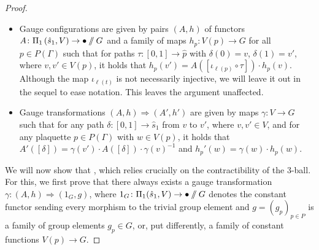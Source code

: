 \documentclass[10pt,a4paper]{amsart}
\newcommand{\sslash}{\mathbin{/\mkern-6mu/}}
\numberwithin{equation}{section}
\theoremstyle{definition}
\begin{document}
\begin{proof}
\begin{itemize}\itemsep=0pt
 \item Gauge configurations are given by pairs $(A, h)$ of functors $A\colon \Pi_1\left(\hat{s}_1, V\right) \rightarrow \bullet \sslash G$ and a family of maps $h_p\colon V(p) \rightarrow G$ for all $p \in P(\Gamma)$ such that for paths $\tau\colon [0,1] \rightarrow \hat{p}$ with $\delta(0) = v$, $\delta(1) = v'$, where $v, v' \in V(p)$, it holds that $h_p(v')= A([\iota_{\ell(p)} \circ \tau]) \cdot h_p(v)$. Although the map $\iota_{\ell(t)}$ is not necessarily injective, we will leave it out in the sequel to ease notation. This leaves the argument unaffected.
 \item Gauge transformations $(A, h) \Rightarrow (A', h')$ are given by maps $\gamma\colon V \rightarrow G$ such that for any path $\delta\colon [0,1] \rightarrow \hat{s}_1$ from $v$ to $v'$, where $v, v' \in V$, and for any plaquette $p \in P(\Gamma)$ with $w \in V(p)$, it holds that $A'([\delta]) = \gamma(v') \cdot A([\delta]) \cdot \gamma(v)^{-1}$ and $h_p'(w) = \gamma(w) \cdot h_p(w)$.
\end{itemize}
We will now show that \smash{$\mathcal{A}^{\mathbb{S}_{\Gamma} \bullet} \sslash \mathcal{G}^{\mathbb{S}_{\Gamma \bullet}} \simeq \bigl(\prod_{p \in P(\Gamma)}G\bigr) \sslash G =: G^P \sslash G$}, which relies crucially on the contractibility of the 3-ball. For this, we first prove that there always exists a gauge transformation $\gamma\colon (A,h) \Rightarrow (1_G, g)$, where $1_G\colon \Pi_1 (\hat{s}_1, V ) \rightarrow \bullet \sslash G$ denotes the constant functor sending every morphism to the trivial group element and $g = (g_p)_{p \in P}$ is a family of group elements $g_p \in G$, or, put differently, a family of constant functions $V(p) \rightarrow G$.


\end{proof}
\end{document}
